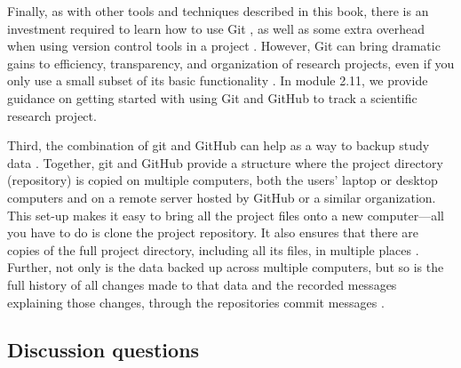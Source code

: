 \documentclass[]{tufte-book}
\begin{document}
Finally, as with other tools and techniques described in this book, there is an
investment required to learn how to use Git \citep{perez2016ten}, as well
as some extra overhead when using version control tools in a project
\citep{raymond2003art}. However, Git can bring dramatic gains to
efficiency, transparency, and organization of research projects, even if you
only use a small subset of its basic functionality \citep{perez2016ten}. In module
2.11, we provide guidance on getting started with using Git and GitHub to track
a scientific research project.

Third, the combination of git and GitHub can help as a way to backup study data
\citep{blischak2016quick, perez2016ten, perkel2018git}. Together, git and GitHub
provide a structure where the project directory (repository) is copied on
multiple computers, both the users' laptop or desktop computers and on a remote
server hosted by GitHub or a similar organization. This set-up makes it easy to
bring all the project files onto a new computer---all you have to do is clone
the project repository. It also ensures that there are copies of the full
project directory, including all its files, in multiple places
\citep{blischak2016quick}. Further, not only is the data backed up across multiple
computers, but so is the full history of all changes made to that data and the
recorded messages explaining those changes, through the repositories commit
messages \citep{perez2016ten}.

\subsection{Discussion questions}\label{discussion-questions-2}
\end{document}

